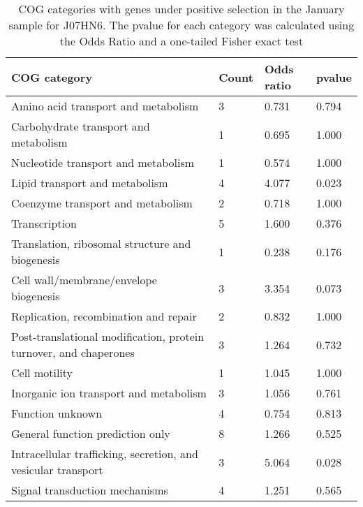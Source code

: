 \begin{table}[]
\footnotesize 
	\tabcolsep=0.11cm 
\caption{COG categories with genes under positive selection in the January sample for J07HN6. The pvalue for each category was calculated using the Odds Ratio and a one-tailed Fisher exact test} 
\begin{tabularx}{\textwidth}{L{6cm}R{2cm}R{2cm}R{2cm}} 
\hline 
\textbf{COG category} & \textbf{Count} & \textbf{Odds ratio} & \textbf{pvalue} \\ 
\hline 
Amino acid transport and metabolism & 3 & 0.731 & 0.794 \\ 
Carbohydrate transport and metabolism & 1 & 0.695 & 1.000 \\ 
Nucleotide transport and metabolism & 1 & 0.574 & 1.000 \\ 
Lipid transport and metabolism & 4 & 4.077 & 0.023 \\ 
Coenzyme transport and metabolism & 2 & 0.718 & 1.000 \\ 
Transcription & 5 & 1.600 & 0.376 \\ 
Translation, ribosomal structure and biogenesis & 1 & 0.238 & 0.176 \\ 
Cell wall/membrane/envelope biogenesis & 3 & 3.354 & 0.073 \\ 
Replication, recombination and repair & 2 & 0.832 & 1.000 \\ 
Post-translational modification, protein turnover, and chaperones & 3 & 1.264 & 0.732 \\ 
Cell motility & 1 & 1.045 & 1.000 \\ 
Inorganic ion transport and metabolism & 3 & 1.056 & 0.761 \\ 
Function unknown & 4 & 0.754 & 0.813 \\ 
General function prediction only & 8 & 1.266 & 0.525 \\ 
Intracellular trafficking, secretion, and vesicular transport & 3 & 5.064 & 0.028 \\ 
Signal transduction mechanisms & 4 & 1.251 & 0.565 \\ 
\end{tabularx} 
\label{January_COG_Selection_J07HN6} 
 \end{table} 

